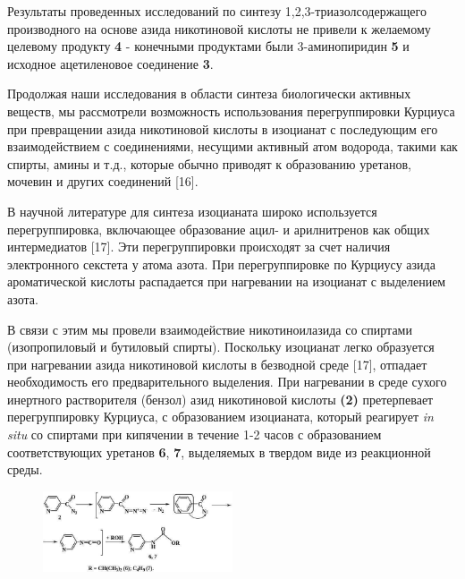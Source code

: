 \begin{multicols}{2}
Результаты проведенных исследований по синтезу 1,2,3-триазолсодержащего
производного на основе азида никотиновой кислоты не привели к желаемому
целевому продукту {\bfseries 4} - конечными продуктами были 3-аминопиридин
{\bfseries 5} и исходное ацетиленовое соединение {\bfseries 3}.

Продолжая наши исследования в области синтеза биологически активных
веществ, мы рассмотрели возможность использования перегруппировки
Курциуса при превращении азида никотиновой кислоты в изоцианат с
последующим его взаимодействием с соединениями, несущими активный атом
водорода, такими как спирты, амины и т.д., которые обычно приводят к
образованию уретанов, мочевин и других соединений {[}16{]}.

В научной литературе для синтеза изоцианата широко используется
перегруппировка, включающее образование ацил- и арилнитренов как общих
интермедиатов {[}17{]}. Эти перегруппировки происходят за счет наличия
электронного секстета у атома азота. При перегруппировке по Курциусу
азида ароматической кислоты распадается при нагревании на изоцианат с
выделением азота.

В связи с этим мы провели взаимодействие никотиноилазида со спиртами
(изопропиловый и бутиловый спирты). Поскольку изоцианат легко образуется
при нагревании азида никотиновой кислоты в безводной среде {[}17{]},
отпадает необходимость его предварительного выделения. При нагревании в
среде сухого инертного растворителя (бензол) азид никотиновой кислоты
{\bfseries (2)} претерпевает перегруппировку Курциуса, с образованием
изоцианата, который реагирует \emph{in situ} со спиртами при кипячении в
течение 1-2 часов с образованием соответствующих уретанов {\bfseries 6},
{\bfseries 7}, выделяемых в твердом виде из реакционной среды.
\end{multicols}

\begin{figure}[H]
	\centering
	\includegraphics[width=0.5\textwidth]{assets/5}
\end{figure}

